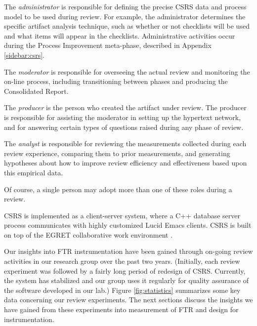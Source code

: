 \begin{itemizenoindent}
  
\item The {\em administrator} is responsible for defining the precise CSRS
  data and process model to be used during review.  For example, the
  administrator determines the specific artifact analysis technique, such as
  whether or not checklists will be used and what items will appear in the
  checklists. Administrative activities occur during the Process Improvement
  meta-phase, described in Appendix \ref{sidebar:csrs}.
  
\item The {\em moderator} is responsible for overseeing the actual review
  and monitoring the on-line process, including transitioning between phases
  and producing the Consolidated Report.
  
\item The {\em producer} is the person who created the artifact under
  review.  The producer is responsible for assisting the moderator in
  setting up the hypertext network, and for answering certain types of
  questions raised during any phase of review.
  
\item The {\em analyst} is responsible for reviewing the measurements
  collected during each review experience, comparing them to prior
  measurements, and generating hypotheses about how to improve review
  efficiency and effectiveness based upon this empirical data.

\end{itemizenoindent}

Of course, a single person may adopt more than one of these roles during a review. 

CSRS is implemented as a client-server system, where a C++ database server
process communicates with highly customized Lucid Emacs clients.  CSRS is
built on top of the EGRET collaborative work environment \cite{csdl-93-09}.

Our insights into FTR instrumentation have been gained through on-going
review activities in our research group over the past two years. (Initially,
each review experiment was followed by a fairly long period of redesign of
CSRS.  Currently, the system has stabilized and our group uses it regularly
for quality assurance of the software developed in our lab.)  
Figure \ref{fig:statistics} summarizes some key data concerning our review
experiments.  The next sections discuss the insights we have gained from 
these experiments into measurement of FTR and design for instrumentation.

